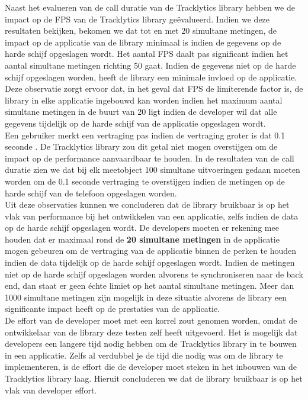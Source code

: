 Naast het evalueren van de call duratie van de Tracklytics library hebben we de impact op de FPS van de Tracklytics library ge\"evalueerd. Indien we deze resultaten bekijken, bekomen we dat tot en met 20 simultane metingen, de impact op de applicatie van de library minimaal is indien de gegevens op de harde schijf opgeslagen wordt. Het aantal FPS daalt pas significant indien het aantal simultane metingen richting 50 gaat. Indien de gegevens niet op de harde schijf opgeslagen worden, heeft de library een minimale invloed op de applicatie. Deze observatie zorgt ervoor dat, in het geval dat FPS de limiterende factor is, de library in elke applicatie ingebouwd kan worden indien het maximum aantal simultane metingen in de buurt van 20 ligt indien de developer wil dat alle gegevens tijdelijk op de harde schijf van de applicatie opgeslagen wordt. \\ 

Een gebruiker merkt een vertraging pas indien de vertraging groter is dat 0.1 seconde \cite{nielsen1994usability}. De Tracklytics library zou dit getal niet mogen overstijgen om de impact op de performance aanvaardbaar te houden. In de resultaten van de call duratie zien we dat bij elk meetobject 100 simultane uitvoeringen gedaan moeten worden om de 0.1 seconde vertraging te overstijgen indien de metingen op de harde schijf van de telefoon opgeslagen worden. \\


Uit deze observaties kunnen we concluderen dat de library bruikbaar is op het vlak van performance bij het ontwikkelen van een applicatie, zelfs indien de data op de harde schijf opgeslagen wordt. De developers moeten er rekening mee houden dat er maximaal rond de \textbf{20 simultane metingen} in de applicatie mogen gebeuren om de vertraging van de applicatie binnen de perken te houden indien de data tijdelijk op de harde schijf opgeslagen wordt. Indien de metingen niet op de harde schijf opgeslagen worden alvorens te synchroniseren naar de back end, dan staat er geen \'echte limiet op het aantal simultane metingen. Meer dan 1000 simultane metingen zijn mogelijk in deze situatie alvorens de library een significante impact heeft op de prestaties van de applicatie. \\

De effort van de developer moet met een korrel zout genomen worden, omdat de ontwikkelaar van de library deze testen zelf heeft uitgevoerd. Het is mogelijk dat developers een langere tijd nodig hebben om de Tracklytics library in te bouwen in een applicatie. Zelfs al verdubbel je de tijd die nodig was om de library te implementeren, is de effort die de developer moet steken in het inbouwen van de Tracklytics library laag. Hieruit concluderen we dat de library bruikbaar is op het vlak van developer effort. \\


